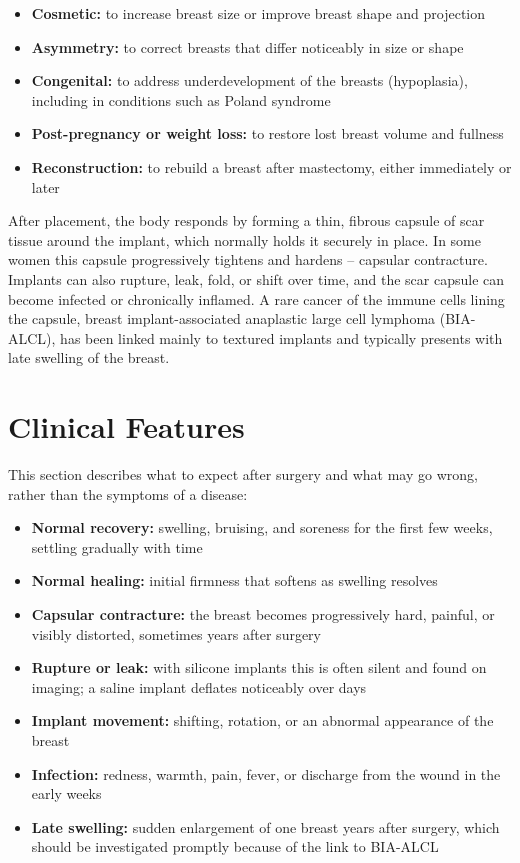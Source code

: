 \begin{itemize}
    \item \textbf{Cosmetic:} to increase breast size or improve breast shape and projection
    \item \textbf{Asymmetry:} to correct breasts that differ noticeably in size or shape
    \item \textbf{Congenital:} to address underdevelopment of the breasts (hypoplasia), including in conditions such as Poland syndrome
    \item \textbf{Post-pregnancy or weight loss:} to restore lost breast volume and fullness
    \item \textbf{Reconstruction:} to rebuild a breast after mastectomy, either immediately or later
\end{itemize}

After placement, the body responds by forming a thin, fibrous capsule of scar tissue around the implant, which normally holds it securely in place. In some women this capsule progressively tightens and hardens -- capsular contracture. Implants can also rupture, leak, fold, or shift over time, and the scar capsule can become infected or chronically inflamed. A rare cancer of the immune cells lining the capsule, breast implant-associated anaplastic large cell lymphoma (BIA-ALCL), has been linked mainly to textured implants and typically presents with late swelling of the breast.

\section*{Clinical Features}
This section describes what to expect after surgery and what may go wrong, rather than the symptoms of a disease:

\begin{itemize}
    \item \textbf{Normal recovery:} swelling, bruising, and soreness for the first few weeks, settling gradually with time
    \item \textbf{Normal healing:} initial firmness that softens as swelling resolves
    \item \textbf{Capsular contracture:} the breast becomes progressively hard, painful, or visibly distorted, sometimes years after surgery
    \item \textbf{Rupture or leak:} with silicone implants this is often silent and found on imaging; a saline implant deflates noticeably over days
    \item \textbf{Implant movement:} shifting, rotation, or an abnormal appearance of the breast
    \item \textbf{Infection:} redness, warmth, pain, fever, or discharge from the wound in the early weeks
    \item \textbf{Late swelling:} sudden enlargement of one breast years after surgery, which should be investigated promptly because of the link to BIA-ALCL
\end{itemize}


